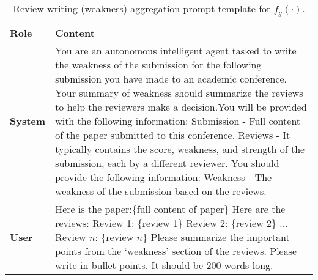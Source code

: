 \begin{table*}[ht]
\centering
\footnotesize
\renewcommand{\arraystretch}{1.3}
\begin{tabular}{p{1cm}p{11.5cm}}
\toprule[1.5pt]
\textbf{Role} & \textbf{Content} \\ 
\cmidrule[0.5pt](lr){1-2}
\textbf{System} & You are an autonomous intelligent agent tasked to write the weakness of the submission for the following submission you have made to an academic conference. Your summary of weakness should summarize the reviews to help the reviewers make a decision.\newline You will be provided with the following information: \newline Submission - Full content of the paper submitted to this conference. \newline Reviews - It typically contains the score, weakness, and strength of the submission, each by a different reviewer. \newline You should provide the following information: \newline Weakness - The weakness of the submission based on the reviews. \\ 
\midrule
\textbf{User} & Here is the paper:\newline \{full content of paper\}\newline
Here are the reviews:\newline
Review 1: \{review 1\}\newline
Review 2: \{review 2\}\newline
...\newline 
Review $n$: \{review $n$\}\newline
Please summarize the important points from the `weakness' section of the reviews. \newline Please write in bullet points. It should be 200 words long. \\ 
\bottomrule[1.5pt]
\end{tabular}
\caption{Review writing (weakness) aggregation prompt template for $f_g(\cdot)$.}
\label{tab:Agent_Metareview_Weakness_Writing_Prompt}
\end{table*}



